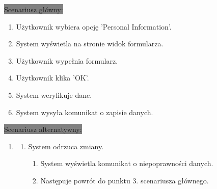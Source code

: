 \documentclass[12pt]{report}
\begin{document}
			\colorbox{grey}{Scenariusz główny:}
			\begin{enumerate}
				\item Użytkownik wybiera opcję 'Personal Information'.
				\item System wyświetla na stronie widok formularza.
				\item Użytkownik wypełnia formularz.
				\item Użytkownik klika 'OK'.
				\item System weryfikuje dane.
				\item System wysyła komunikat o zapisie danych.
			\end{enumerate}

			\colorbox{grey}{Scenariusz alternatywny:}
			\begin{enumerate}\addtocounter{enumi}{5}
				\item[]
				\begin{enumerate}
					\item System odrzuca zmiany.
					\begin{enumerate}
						\item System wyświetla komunikat o niepoprawności danych.
						\item Następuje powrót do punktu 3. scenariusza głównego.
					\end{enumerate}
				\end{enumerate}
			\end{enumerate}
		
		
\end{document}
